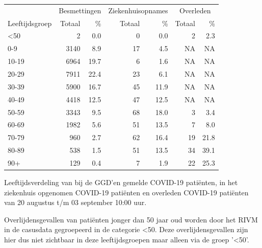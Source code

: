 \documentclass[
  english,
  man,floatsintext]{apa6}
\begin{document}
\begin{table}
\centering\begingroup\fontsize{11}{13}\selectfont

\begin{threeparttable}
\begin{tabular}{lrrrrrr}
\toprule
\multicolumn{1}{c}{ } & \multicolumn{2}{c}{Besmettingen} & \multicolumn{2}{c}{Ziekenhuisopnames} & \multicolumn{2}{c}{Overleden} \\
\cmidrule(l{3pt}r{3pt}){2-3} \cmidrule(l{3pt}r{3pt}){4-5} \cmidrule(l{3pt}r{3pt}){6-7}
Leeftijdsgroep & Totaal & \% & Totaal & \% & Totaal & \%\\
\midrule
<50 & 2 & 0.0 & 0 & 0.0 & 2 & 2.3\\
0-9 & 3140 & 8.9 & 17 & 4.5 & NA & NA\\
10-19 & 6964 & 19.7 & 6 & 1.6 & NA & NA\\
20-29 & 7911 & 22.4 & 23 & 6.1 & NA & NA\\
30-39 & 5900 & 16.7 & 45 & 11.9 & NA & NA\\
40-49 & 4418 & 12.5 & 47 & 12.5 & NA & NA\\
50-59 & 3343 & 9.5 & 68 & 18.0 & 3 & 3.4\\
60-69 & 1982 & 5.6 & 51 & 13.5 & 7 & 8.0\\
70-79 & 960 & 2.7 & 62 & 16.4 & 19 & 21.8\\
80-89 & 538 & 1.5 & 51 & 13.5 & 34 & 39.1\\
90+ & 129 & 0.4 & 7 & 1.9 & 22 & 25.3\\
\bottomrule
\end{tabular}
\begin{tablenotes}
\item[1] Leeftijdsverdeling van bij de GGD’en gemelde COVID-19 patiënten, in het ziekenhuis opgenomen COVID-19 patiënten en overleden COVID-19 patiënten van 20 augustus t/m 03 september 10:00 uur.
\item[2] Overlijdensgevallen van patiënten jonger dan 50 jaar oud worden door het RIVM in de casusdata gegroepeerd in de categorie <50. Deze overlijdensgevallen zijn hier dus niet zichtbaar in deze leeftijdsgroepen maar alleen via de groep '<50'.
\end{tablenotes}
\end{threeparttable}
\endgroup{}
\end{table}

\newpage
\end{document}
